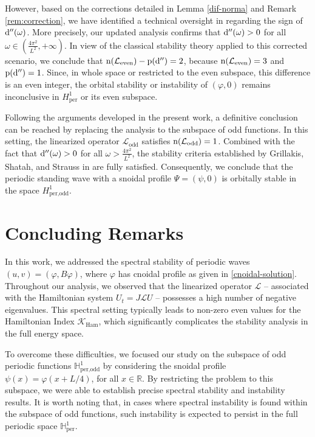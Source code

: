 \documentclass[10pt,reqno,a4paper]{amsart} %
\theoremstyle{definition} %
\numberwithin{equation}{section}
\numberwithin{figure}{section}
\begin{document}
However, based on the corrections detailed in Lemma \ref{dif-norma} and  Remark  \ref{rem:correction}, we have identified a technical oversight in \cite{BittencourtLoreno2022} regarding the sign of ${\rm d}''(\omega)$. More precisely, our updated analysis confirms that ${\rm d}''(\omega) > 0$ for all $\omega \in \left( \frac{4\pi^2}{L^2}, +\infty \right)$. In view of the classical stability theory applied to this corrected scenario, we conclude that ${\rm n}(\mathcal{L}_{\text{even}}) - {\rm p}({\rm d}'') = 2$, because  ${\rm n}(\mathcal{L}_{\text{even}}) = 3$ and ${\rm p}({\rm d}'') = 1$. Since, in whole space or restricted to the even subspace, this difference is an even integer, the orbital stability or instability of $(\varphi,0)$ remains inconclusive in $H^1_{\text{per}}$ or its even subspace.

Following the arguments developed in the present work, a definitive conclusion can be reached by replacing the analysis to the subspace of odd functions. In this setting, the linearized operator $\mathcal{L}_{\text{odd}}$ satisfies ${\rm n}(\mathcal{L}_{\text{odd}}) = 1$. Combined with the fact that ${\rm d}''(\omega) > 0$ for all $\omega > \frac{4\pi^2}{L^2}$, the stability criteria established by Grillakis, Shatah, and Strauss in \cite{grillakis1} are fully satisfied. Consequently, we conclude that the periodic standing wave with a snoidal profile $\Psi = (\psi, 0)$ is orbitally stable in the space $H^1_{\text{per,odd}}$.

\vspace{0.5cm}

\section*{Concluding Remarks}

In this work, we addressed the spectral stability of periodic waves $(u, v) = (\varphi, B\varphi)$, where $\varphi$ has cnoidal profile as given in \eqref{cnoidal-solution}. Throughout our analysis, we observed that the linearized operator $\mathcal{L}$ -- associated with the Hamiltonian system $U_t = J\mathcal{L}U$ -- possesses a high number of negative eigenvalues. This spectral setting typically leads to non-zero even values for the Hamiltonian Index $\mathcal{K}_{\text{Ham}}$, which significantly complicates the stability analysis in the full energy space.

To overcome these difficulties, we focused our study on the subspace of odd periodic functions $\mathbb{H}^1_{\text{per,odd}}$ by considering the snoidal profile $\psi(x) = \varphi(x + L/4)$, for all $x \in \mathbb{R}$. By restricting the problem to this subspace, we were able to establish precise spectral stability and instability results. It is worth noting that, in cases where spectral instability is found within the subspace of odd functions, such instability is expected to persist in the full periodic space $\mathbb{H}^1_{\text{per}}$.
\end{document}
